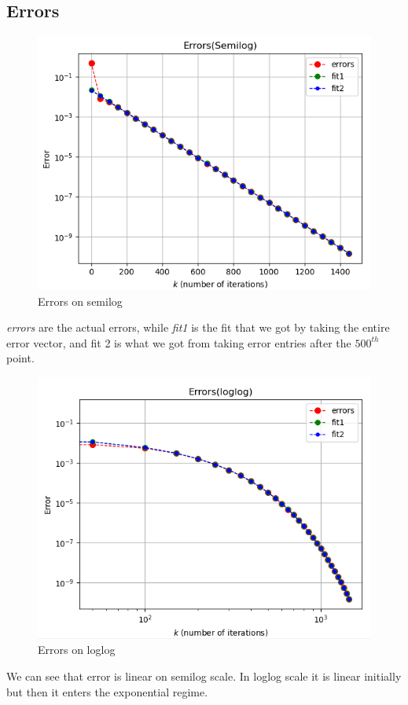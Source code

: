\documentclass[11pt, a4paper]{article}
\begin{document}
    \subsection{Errors}
    \begin{figure}[!h]
        \centering
        \includegraphics[scale=0.85]{Figure2.png}
        \caption{Errors on semilog}
        \label{fig:Figure 2l}
    \end{figure}
    \textit{errors} are the actual errors, while \textit{fit1} is the fit that we got by taking the entire error vector, and fit 2 is what we got from taking error entries after the $500^{th}$ point.
    \begin{figure}[!h]
        \centering
        \includegraphics[scale=0.85]{Figure3.png}
        \caption{Errors on loglog}
        \label{fig:Figure 3}
    \end{figure}
    We can see that error is linear on semilog scale. In loglog scale it is linear initially but then it enters the exponential regime.
\end{document}
